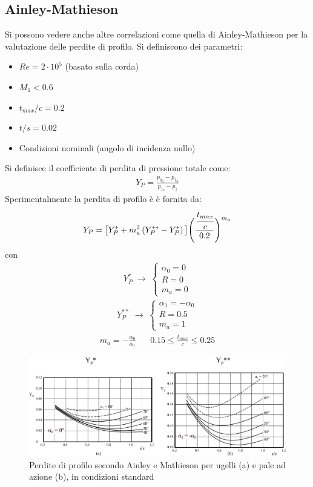 \subsection{Ainley-Mathieson}
Si possono vedere anche altre correlazioni come quella di Ainley-Mathieson per la valutazione delle perdite di profilo. Si definiscono dei parametri:
\begin{itemize}
\item $Re = 2 \cdot 10^5$ (basato sulla corda)
\item $M_1 < 0.6$
\item $t_{max}/c = 0.2$
\item $t/s = 0.02$
\item Condizioni nominali (angolo di incidenza nullo)
\end{itemize}
Si definisce il coefficiente di perdita di pressione totale come:
\begin{align*}
Y_P = \frac{p_{0_0} - p_{1_0}}{p_{1_0} - p_1}
\end{align*}
Sperimentalmente la perdita di profilo è è fornita da:
\begin{align*}
Y_P = \big[ Y_P^* + m_a^2 \left( Y_P^{**} - Y_P^* \right) \big] \Bigg(\frac{\cfrac{t_{max}}{c}}{0.2} \Bigg)^{m_a}
\end{align*}
con 
\begin{align*}
Y_P^* \; \to \;
\begin{cases}
\alpha_0 = 0\\
R = 0\\
m_a = 0
\end{cases}
\end{align*}
\begin{align*}
Y_P^{**} \; \to \;
\begin{cases}
\alpha_1 = -\alpha_0\\
R = 0.5\\
m_a = 1
\end{cases}
\end{align*}
\begin{align*}
m_a = - \frac{\alpha_0}{\alpha_1} \;\;\;\;\;\; 0.15 \leq \frac{t_{max}}{c} \leq 0.25
\end{align*}
\begin{figure}
\centering
  \includegraphics[width=\textwidth]{fig/Mathieson.pdf}
\caption{Perdite di profilo secondo Ainley e Mathieson per ugelli (a) e pale ad azione (b), in condizioni standard}
\label{fig:Mathieson}
\end{figure}
